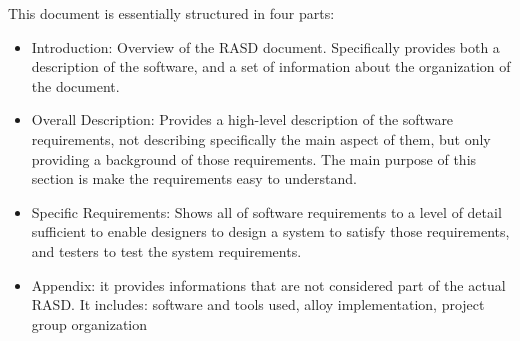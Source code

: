 This document is essentially structured in four parts:
\begin{itemize}
	\item Introduction: Overview of the RASD document. Specifically provides both a description of the software, and a set of information about the organization of the document.
	\item Overall Description: Provides a high-level description of the software requirements, not describing specifically the main aspect of them, but only providing a background of those requirements. The main purpose of this section is make the requirements easy to understand.
	\item Specific Requirements: Shows all of software requirements to a level of detail sufficient to enable designers to design a system to satisfy those requirements, and testers to test the system requirements.
	\item Appendix: it provides informations that are not considered part of the actual RASD. It includes: software and tools used, alloy implementation, project group organization
\end{itemize}
